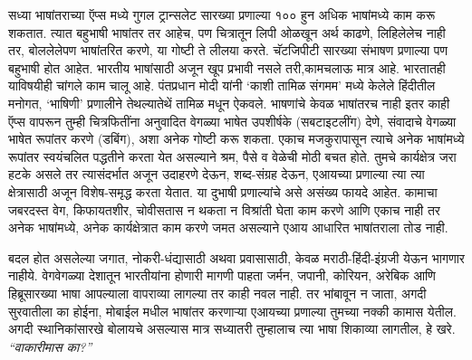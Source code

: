 सध्या भाषांतराच्या ऍप्स मध्ये गुगल ट्रान्सलेट सारख्या प्रणाल्या १०० हुन अधिक भाषांमध्ये काम करू शकतात. त्यात बहुभाषी भाषांतर तर आहेच, पण चित्रातून लिपी ओळखून अर्थ काढणे, लिहिलेलेच नाही तर, बोललेलेपण भाषांतरित करणे, या गोष्टी ते लीलया करते. चॅटजिपीटी सारख्या संभाषण प्रणाल्या पण बहुभाषी होत आहेत. भारतीय भाषांसाठी अजून खूप प्रभावी नसले तरी,कामचलाऊ मात्र आहे. भारतातही याविषयीही चांगले काम चालू आहे. पंतप्रधान मोदी यांनी `काशी तामिळ संगमम' मध्ये केलेले हिंदीतील मनोगत, `भाषिणी' प्रणालीने तेथल्यातेथें तामिळ मधून ऐकवले.  भाषणांचे केवळ भाषांतरच नाही इतर काही ऍप्स वापरून तुम्ही चित्रफितींना अनुवादित वेगळ्या भाषेत उपशीर्षके (सबटाइटलींग) देणे, संवादाचे वेगळ्या भाषेत रूपांतर करणे (डबिंग), अशा अनेक गोष्टी करू शकता. एकाच मजकुरापासून त्याचे अनेक भाषांमध्ये रूपांतर स्वयंचलित पद्धतीने करता येत असल्याने श्रम, पैसे व वेळेची मोठी बचत होते. तुमचे कार्यक्षेत्र जरा हटके असले तर त्यासंदर्भात अजून उदाहरणे देऊन, शब्द-संग्रह देऊन, एआयच्या प्रणाल्या त्या त्या क्षेत्रासाठी अजून विशेष-समृद्ध करता येतात. या दुभाषी प्रणाल्यांचे असे असंख्य फायदे आहेत. कामाचा जबरदस्त वेग, किफायतशीर, चोवीसतास न थकता न विश्रांती घेता काम करणे आणि एकाच नाही तर अनेक भाषांमध्ये, अनेक कार्यक्षेत्रात काम करणे जमत असल्याने एआय आधारित भाषांतराला तोड नाही.

बदल होत असलेल्या जगात, नोकरी-धंद्यासाठी अथवा प्रवासासाठी, केवळ मराठी-हिंदी-इंग्रजी येऊन भागणार नाहीये. वेगवेगळ्या देशातून भारतीयांना होणारी मागणी पाहता जर्मन, जपानी, कोरियन, अरेबिक आणि हिब्रूसारख्या भाषा आपल्याला वापराव्या लागल्या तर काही नवल नाही. तर भांबावून न जाता, अगदी सुरवातीला का होईना, मोबाईल मधील भाषांतर करणाऱ्या एआयच्या प्रणाल्या तुमच्या नक्की कामास येतील. अगदी स्थानिकांसारखे बोलायचे असल्यास मात्र सध्यातरी तुम्हालाच त्या भाषा शिकाव्या लागतील, हे खरे. {\textit{``वाकारीमास का?''}} %